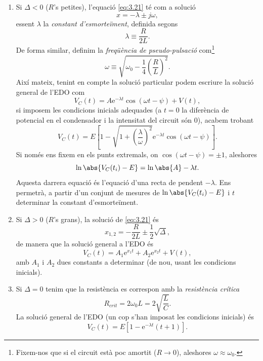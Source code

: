 \documentclass[a4paper,10.5pt]{report}
\begin{document}
\begin{enumerate}
	\item Si $\Delta < 0$ ($R$'s petites), l'equació \eqref{eq:3.21} té com a solució
	\begin{equation}
		x = - \lambda \pm j\omega,
	\end{equation}
	essent $\lambda$ la \textit{constant d'esmorteïment}, definida segons
	\begin{equation}
		\lambda \equiv \frac{R}{2L}.
		\label{eq:3.24}
	\end{equation}
	De forma similar, definim la \textit{freqüència de pseudo-pulsació} com\footnote{Fixem-nos que si el circuit està poc amortit ($R\rightarrow 0$), aleshores $\omega \approx \omega_0$.}
	\begin{equation}
		\omega \equiv \sqrt{\omega_0 - \frac{1}{4}\left(\frac{R}{L}\right)^2}. \label{eq:3.25}
	\end{equation}
	Així mateix, tenint en compte la solució particular podem escriure la solució general de l'EDO com
	\begin{equation}
		V_C(t) = A \mathrm{e}^{-\lambda t}\cos(\omega t - \psi) + V(t),
	\end{equation}
	si imposem les condicions inicials adequades (a $t=0$ la diferència de potencial en el condensador i la intensitat del circuit són 0), acabem trobant
	\begin{equation}
		\boxed{V_C(t) = E \left[1-\sqrt{1+\left(\frac{\lambda}{\omega}\right)^2}\mathrm{e}^{-\lambda t}\cos(\omega t - \psi)\right]}. 
		\label{eq:3.27}
	\end{equation}
	Si només ens fixem en els punts extremals, on $\cos(\omega t - \psi) = \pm 1$, aleshores
	\begin{equation}
		\ln\abs{V_C(t_i)-E} = \ln\abs{A}-\lambda t. \label{eq:3.28}
	\end{equation}
	Aquesta darrera equació és l'equació d'una recta de pendent $-\lambda$. Ens permetrà, a partir d'un conjunt de mesures de $\ln\abs{V_C(t_i)-E}$ i $t$ determinar la constant d'esmorteïment.
	\item Si $\Delta > 0$ ($R$'s grans), la solució de \eqref{eq:3.21} és
	\begin{equation}
		x_{1,2} = -\frac{R}{2L}\pm \frac{1}{2}\sqrt{\Delta},
	\end{equation}
	de manera que la solució general a l'EDO és
	\begin{equation}
		\boxed{V_C(t) = A_1 \mathrm{e}^{x_1t}+A_2\mathrm{e}^{x_2t}+V(t)},
	\end{equation}
	amb $A_1$ i $A_2$ dues constants a determinar (de nou, usant les condicions inicials).
	\item Si $\Delta = 0$ tenim que la resistència es correspon amb la \textit{resistència crítica}
	\begin{equation}
		R_{crit} = 2\omega_0L = 2\sqrt{\frac{L}{C}} \label{eq:3.31}.
	\end{equation}
	La solució general de l'EDO (un cop s'han imposat les condicions inicials) és
	\begin{equation}
		\boxed{V_C(t) = E[1-\mathrm{e}^{-\lambda t}(t+1)]}.
	\end{equation}
\end{enumerate}
\end{document}
